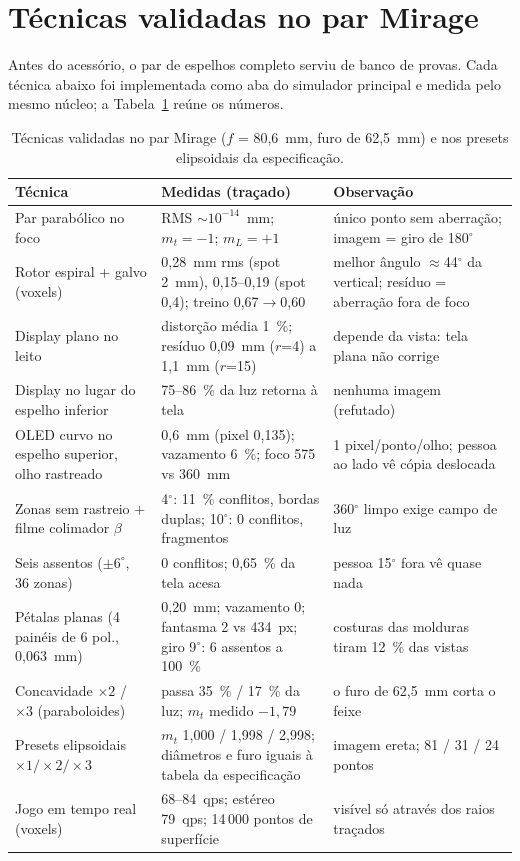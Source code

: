 \documentclass[journal,10pt]{IEEEtran}
\begin{document}
\section{T\'ecnicas validadas no par Mirage}
\label{sec:mirage}
Antes do acess\'orio, o par de espelhos completo serviu de banco de provas. Cada t\'ecnica abaixo foi implementada como aba do simulador principal e medida pelo mesmo n\'ucleo; a Tabela~\ref{tab:mirage} re\'une os n\'umeros.

\begin{table}[t]
\centering
\caption{T\'ecnicas validadas no par Mirage ($f$ = 80,6~mm, furo de 62,5~mm) e nos presets elipsoidais da especifica\c{c}\~ao.}
\label{tab:mirage}
\small
\begin{tabular}{@{}p{4.1cm}p{6.6cm}p{5.6cm}@{}}
\toprule
T\'ecnica & Medidas (tra\c{c}ado) & Observa\c{c}\~ao \\
\midrule
Par parab\'olico no foco & RMS $\sim10^{-14}$~mm; $m_t=-1$; $m_L=+1$ & \'unico ponto sem aberra\c{c}\~ao; imagem = giro de 180$^\circ$ \\
Rotor espiral + galvo (voxels) & 0,28~mm rms (spot 2~mm), 0,15--0,19 (spot 0,4); treino 0,67$\to$0,60 & melhor \^angulo $\approx$44$^\circ$ da vertical; res\'iduo = aberra\c{c}\~ao fora de foco \\
Display plano no leito & distor\c{c}\~ao m\'edia 1~\%; res\'iduo 0,09~mm ($r$=4) a 1,1~mm ($r$=15) & depende da vista: tela plana n\~ao corrige \\
Display no lugar do espelho inferior & 75--86~\% da luz retorna \`a tela & nenhuma imagem (refutado) \\
OLED curvo no espelho superior, olho rastreado & 0,6~mm (pixel 0,135); vazamento 6~\%; foco 575 vs 360~mm & 1 pixel/ponto/olho; pessoa ao lado v\^e c\'opia deslocada \\
Zonas sem rastreio + filme colimador $\beta$ & 4$^\circ$: 11~\% conflitos, bordas duplas; 10$^\circ$: 0 conflitos, fragmentos & 360$^\circ$ limpo exige campo de luz \\
Seis assentos ($\pm6^\circ$, 36 zonas) & 0 conflitos; 0,65~\% da tela acesa & pessoa 15$^\circ$ fora v\^e quase nada \\
P\'etalas planas (4 pain\'eis de 6 pol., 0,063~mm) & 0,20~mm; vazamento 0; fantasma 2 vs 434~px; giro 9$^\circ$: 6 assentos a 100~\% & costuras das molduras tiram 12~\% das vistas \\
Concavidade $\times2$ / $\times3$ (paraboloides) & passa 35~\% / 17~\% da luz; $m_t$ medido $-1{,}79$ & o furo de 62,5~mm corta o feixe \\
Presets elipsoidais $\times1/\times2/\times3$ & $m_t$ 1,000 / 1,998 / 2,998; di\^ametros e furo iguais \`a tabela da especifica\c{c}\~ao & imagem ereta; 81 / 31 / 24 pontos \\
Jogo em tempo real (voxels) & 68--84~qps; est\'ereo 79~qps; 14\,000 pontos de superf\'icie & vis\'ivel s\'o atrav\'es dos raios tra\c{c}ados \\
\bottomrule
\end{tabular}
\end{table}
\end{document}
